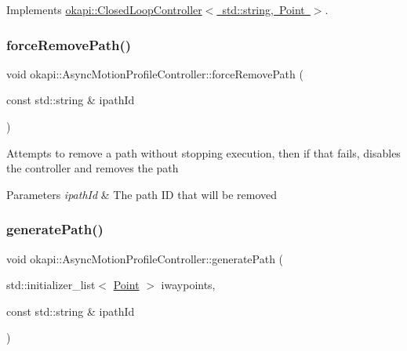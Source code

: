 Implements \mbox{\hyperlink{classokapi_1_1ClosedLoopController_a768cd1db40ce9cd5c89b20be6e838ccc}{okapi\+::\+Closed\+Loop\+Controller$<$ std\+::string, Point $>$}}.

\mbox{\label{classokapi_1_1AsyncMotionProfileController_ace5f9053d3455e6f5e69c63f1196521e}} 
\subsubsection{\texorpdfstring{forceRemovePath()}{forceRemovePath()}}
{\footnotesize\ttfamily void okapi\+::\+Async\+Motion\+Profile\+Controller\+::force\+Remove\+Path (\begin{DoxyParamCaption}\item[{const std\+::string \&}]{ipath\+Id }\end{DoxyParamCaption})}

Attempts to remove a path without stopping execution, then if that fails, disables the controller and removes the path


\begin{DoxyParams}{Parameters}
{\em ipath\+Id} & The path ID that will be removed \\
\hline
\end{DoxyParams}
\mbox{\label{classokapi_1_1AsyncMotionProfileController_a767919702ab379bac5273010baf03cda}} 
\subsubsection{\texorpdfstring{generatePath()}{generatePath()}\hspace{0.1cm}{\footnotesize\ttfamily [1/2]}}
{\footnotesize\ttfamily void okapi\+::\+Async\+Motion\+Profile\+Controller\+::generate\+Path (\begin{DoxyParamCaption}\item[{std\+::initializer\+\_\+list$<$ \mbox{\hyperlink{structokapi_1_1Point}{Point}} $>$}]{iwaypoints,  }\item[{const std\+::string \&}]{ipath\+Id }\end{DoxyParamCaption})}


